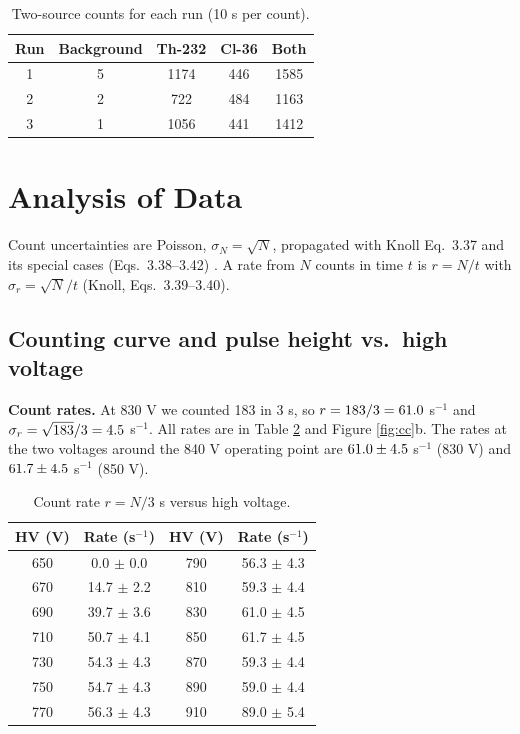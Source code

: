 \documentclass[12pt]{article}
\begin{document}
\begin{table}[!htbp]
\centering\small
\begin{tabular}{ccccc}
\toprule
\textbf{Run} & \textbf{Background} & \textbf{Th-232} & \textbf{Cl-36} & \textbf{Both} \\
\midrule
1 & 5 & 1174 & 446 & 1585 \\
2 & 2 & 722 & 484 & 1163 \\
3 & 1 & 1056 & 441 & 1412 \\
\bottomrule
\end{tabular}
\caption{Two-source counts for each run (10 s per count).}
\label{tab:rawtwo}
\end{table}


\section{Analysis of Data}

Count uncertainties are Poisson, $\sigma_N = \sqrt{N}$, propagated with Knoll Eq.\ 3.37 and its special cases (Eqs.\ 3.38--3.42) \cite{knoll}. A rate from $N$ counts in time $t$ is $r = N/t$ with $\sigma_r = \sqrt{N}/t$ (Knoll, Eqs.\ 3.39--3.40).

\subsection{Counting curve and pulse height vs.\ high voltage}

\textbf{Count rates.} At 830 V we counted 183 in 3 s, so $r = 183/3 = 61.0$ s$^{-1}$ and $\sigma_r = \sqrt{183}/3 = 4.5$ s$^{-1}$. All rates are in Table \ref{tab:rate} and Figure \ref{fig:cc}b. The rates at the two voltages around the 840 V operating point are $61.0 \pm 4.5$ s$^{-1}$ (830 V) and $61.7 \pm 4.5$ s$^{-1}$ (850 V).

\begin{table}[!htbp]
\centering\small
\begin{tabular}{cc|cc}
\toprule
\textbf{HV (V)} & \textbf{Rate (s$^{-1}$)} & \textbf{HV (V)} & \textbf{Rate (s$^{-1}$)} \\
\midrule
650 & 0.0 $\pm$ 0.0 & 790 & 56.3 $\pm$ 4.3 \\
670 & 14.7 $\pm$ 2.2 & 810 & 59.3 $\pm$ 4.4 \\
690 & 39.7 $\pm$ 3.6 & 830 & 61.0 $\pm$ 4.5 \\
710 & 50.7 $\pm$ 4.1 & 850 & 61.7 $\pm$ 4.5 \\
730 & 54.3 $\pm$ 4.3 & 870 & 59.3 $\pm$ 4.4 \\
750 & 54.7 $\pm$ 4.3 & 890 & 59.0 $\pm$ 4.4 \\
770 & 56.3 $\pm$ 4.3 & 910 & 89.0 $\pm$ 5.4 \\
\bottomrule
\end{tabular}
\caption{Count rate $r = N/3$ s versus high voltage.}
\label{tab:rate}
\end{table}
\end{document}
